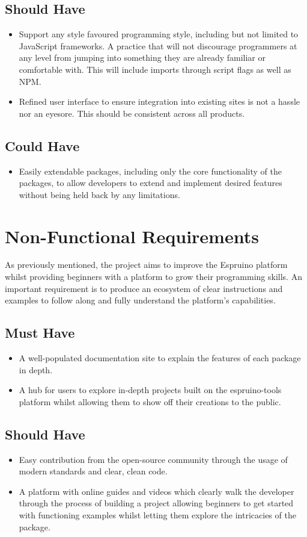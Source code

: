 \documentclass{l4proj}
\begin{document}
\subsection{Should Have}
\begin{itemize}
    \item Support any style favoured programming style, including but not limited to JavaScript frameworks. A practice that will not discourage programmers at any level from jumping into something they are already familiar or comfortable with. This will include imports through script flags as well as NPM.
    \item Refined user interface to ensure integration into existing sites is not a hassle nor an eyesore. This should be consistent across all products.
\end{itemize}
\subsection{Could Have}
\begin{itemize}
    \item Easily extendable packages, including only the core functionality of the packages, to allow developers to extend and implement desired features without being held back by any limitations.
\end{itemize}
\section{Non-Functional Requirements}
\text As previously mentioned, the project aims to improve the Espruino platform whilst providing beginners with a platform to grow their programming skills. An important requirement is to produce an ecosystem of clear instructions and examples to follow along and fully understand the platform's capabilities.
\subsection{Must Have}
\begin{itemize}
    \item A well-populated documentation site to explain the features of each package in depth.
    \item A hub for users to explore in-depth projects built on the espruino-tools platform whilst allowing them to show off their creations to the public.
    
\end{itemize} 
\subsection{Should Have}
\begin{itemize}
    \item Easy contribution from the open-source community through the usage of modern standards and clear, clean code.
    \item A platform with online guides and videos which clearly walk the developer through the process of building a project allowing beginners to get started with functioning examples whilst letting them explore the intricacies of the package.
\end{itemize} 
\end{document}

